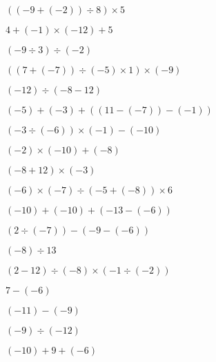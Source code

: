 {{\item$((-9 + (-2)) \div 8) \times 5$  \item$4 + (-1) \times (-12) + 5$
\item$(-9 \div 3) \div (-2)$  \item$((7 + (-7)) \div (-5) \times 1) \times (-9)$
\item$(-12) \div (-8 - 12)$  \item$(-5) + (-3) + ((11 - (-7)) - (-1))$
\item$(-3 \div (-6)) \times (-1) - (-10)$  \item$(-2) \times (-10) + (-8)$
\item$(-8 + 12) \times (-3)$  \item$(-6) \times (-7) \div (-5 + (-8)) \times 6$
\item$(-10) + (-10) + (-13 - (-6))$  \item$(2 \div (-7)) - (-9 - (-6))$
\item$(-8) \div 13$  \item$(2 - 12) \div (-8) \times (-1 \div (-2))$
\item$7 - (-6)$  \item$(-11) - (-9)$
\item$(-9) \div (-12)$  \item$(-10) + 9 + (-6)$
}}

\newpage

